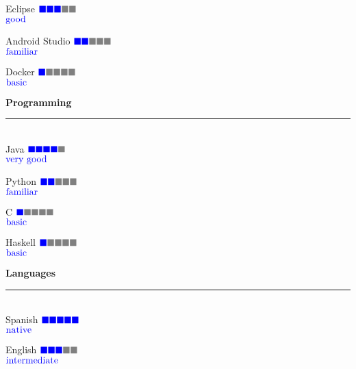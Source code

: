 \documentclass{article}
\begin{document}
\begin{minipage}{0.3\linewidth}
  \large Eclipse \hfill $\color{blue} \blacksquare\color{blue} \blacksquare \color{blue} \blacksquare \color{gray} \blacksquare  \color{gray} \blacksquare$  \\[-0.8mm]
  \null\hfill \small{ $\color{blue} \textnormal{good}$}

  \large Android Studio \hfill $\color{blue} \blacksquare\color{blue} \blacksquare \color{gray} \blacksquare \color{gray} \blacksquare  \color{gray} \blacksquare$  \\[-0.8mm]
  \null\hfill \small{ $\color{blue} \textnormal{familiar}$}

  \large Docker \hfill $\color{blue} \blacksquare\color{gray} \blacksquare \color{gray} \blacksquare \color{gray} \blacksquare  \color{gray} \blacksquare$  \\[-0.8mm]
  \null\hfill \small{ $\color{blue} \textnormal{basic}$}

  \vspace{0.3cm}
  \textbf{\Large{\color{BlueViolet}Programming}}\\[-0.25cm]
  {\color{BlueViolet} \rule{\linewidth}{0.1mm} }\\
  \large Java \hfill $\color{blue} \blacksquare\color{blue} \blacksquare \color{blue} \blacksquare \color{blue} \blacksquare  \color{gray} \blacksquare$  \\[-0.8mm]
  \null\hfill \small{ $\color{blue} \textnormal{very good}$}

  \large Python \hfill $\color{blue} \blacksquare\color{blue} \blacksquare \color{gray} \blacksquare \color{gray} \blacksquare  \color{gray} \blacksquare$  \\[-0.8mm]
  \null\hfill \small{ $\color{blue} \textnormal{familiar}$}

  \large C \hfill $\color{blue} \blacksquare \color{gray} \blacksquare \color{gray} \blacksquare \color{gray} \blacksquare  \color{gray} \blacksquare$  \\[-0.8mm]
  \null\hfill \small{ $\color{blue} \textnormal{basic}$}

  \large Haskell \hfill $\color{blue} \blacksquare \color{gray} \blacksquare \color{gray} \blacksquare \color{gray} \blacksquare  \color{gray} \blacksquare$  \\[-0.8mm]
  \null\hfill \small{ $\color{blue} \textnormal{basic}$}

  \textbf{\Large{\color{BlueViolet}Languages}}\\[-0.25cm]
  {\color{BlueViolet} \rule{\linewidth}{0.1mm} }\\
  \large Spanish \hfill $\color{blue} \blacksquare\color{blue} \blacksquare \color{blue} \blacksquare \color{blue} \blacksquare  \color{blue} \blacksquare$  \\[-0.8mm]
  \null\hfill \small{ $\color{blue} \textnormal{native}$}

  \large English \hfill $\color{blue} \blacksquare\color{blue} \blacksquare \color{blue} \blacksquare \color{gray} \blacksquare  \color{gray} \blacksquare$  \\[-0.8mm]
  \null\hfill \small{ $\color{blue} \textnormal{intermediate}$}
  
\end{minipage}
\end{document}
